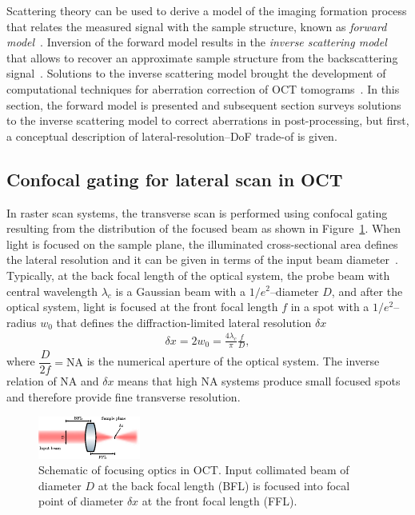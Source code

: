 Scattering theory can be used to derive a model of the imaging formation process that relates the measured signal with the sample structure, known as \textit{forward model}~\cite{Ralston2006_Inverse, Ralston2006_NonParaxial}. Inversion of the forward model results in the \textit{inverse scattering model} that allows to recover an approximate sample structure from the backscattering signal~\cite{Ralston2006_Interferometric}. Solutions to the inverse scattering model brought the development of computational techniques for aberration correction of OCT tomograms~\cite{Ralston2006_Interferometric, Yasuno2006_Noniterative, Adie2012_Computational}. In this section, the forward model is presented and subsequent section surveys solutions to the inverse scattering model to correct aberrations in post-processing, but first, a conceptual description of lateral-resolution--DoF trade-of is given.

\subsection{Confocal gating for lateral scan in OCT}

In raster scan systems, the transverse scan is performed using confocal gating resulting from the distribution of the focused beam as shown in Figure~\ref{fig:FocusingLens}. When light is focused on the sample plane, the illuminated cross-sectional area defines the lateral resolution and it can be given in terms of the input beam diameter~\cite{Yasuno2006_Noniterative}. Typically, at the back focal length of the optical system, the probe beam with central wavelength $\lambda_c$ is a Gaussian beam with a $1/e^2$--diameter $D$, and after the optical system, light is focused at the front focal length $f$ in a spot with a $1/e^2$--radius $w_0$ that defines the diffraction-limited lateral resolution $\delta x$~\cite{Fujimoto2015_Introduction}
\begin{align}
    \delta x = 2w_0 = \frac{4\lambda_c}{\pi} \frac{f}{D},
\end{align}
where $\dfrac{D}{2f} = \text{NA}$ is the numerical aperture of the optical system. The inverse relation of NA and $\delta x$ means that high NA systems produce small focused spots and therefore provide fine transverse resolution.

\begin{figure}[htb!]
    \centering
    \includegraphics[width=.6\textwidth]{Figures/TheoreticalBasis/FocusingLens.pdf}
    \caption[Schematic of focusing optics in OCT.]{Schematic of focusing optics in OCT. Input collimated beam of diameter $D$ at the back focal length (BFL) is focused into focal point of diameter $\delta x$ at the front focal length (FFL).}
    \label{fig:FocusingLens}
\end{figure}

